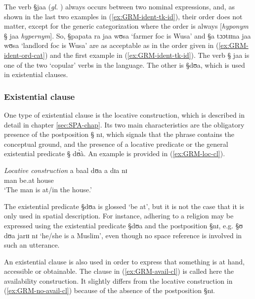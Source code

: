 The verb {\S jaa}  ({\it gl.} {\ident})
always  occurs between two nominal  expressions,  and, as shown in the 
last two examples in (\ref{ex:GRM-ident-tk-id}),  their order  does not matter,
except for the generic categorization where the order is always [{\it hyponym}
{\S
jaa} {\it hypernym}].  So,  {\S papata ra jaa  wʊsa} `farmer {\sc foc} is Wusa' 
and {\S a
tɔɔtɪɪna  jaa  wʊsa} `landlord {\sc foc} is Wusa'  are  as acceptable as in the
order given
in (\ref{ex:GRM-ident-ord-cat}) and the first example
 in (\ref{ex:GRM-ident-tk-id}).    The verb {\S
jaa} is one of the two `copular'
verbs in the language. The other is {\S dʊa}, which is used in existential
clauses.


\subsubsection{Existential clause} 
\label{sec:GRM-loc-cl}

One type of existential clause is the  locative construction, which is
described in detail in chapter \ref{sec:SPA-chap}. Its
two main characteristics are the obligatory presence of the postposition {\S
nɪ},  which signals that the phrase contains the conceptual ground, and the
presence of a locative predicate or the general existential predicate {\S
dʊ̀à}. An example is provided in (\ref{ex:GRM-loc-cl}).

\begin{exe}
\ex\label{ex:GRM-loc-cl}{\it Locative construction}
\gll a baal dʊa a dɪa nɪ\\
{\art}  man be.at {\art} house {\postp}\\
\glt  `The man is at/in the house.'
\end{exe}

The existential predicate {\S dʊa} is glossed `be at', but it is not the case
that it is only used in spatial description. For instance,  adhering to a
religion may be expressed using the existential predicate {\S dʊa} and the
postposition {\S nɪ}, e.g.  {\S ʊ dʊa jarɪɪ nɪ} `he/she is a Muslim', even
though no space reference is involved in such an utterance. 

An existential clause is also used in order to express that something is at
hand, accessible or obtainable. The clause in (\ref{ex:GRM-avail-cl}) is called
here 
the availability construction. It slightly differs from the
locative
construction in (\ref{ex:GRM-no-avail-cl}) because of  the absence of the
postposition
{\S nɪ}.

